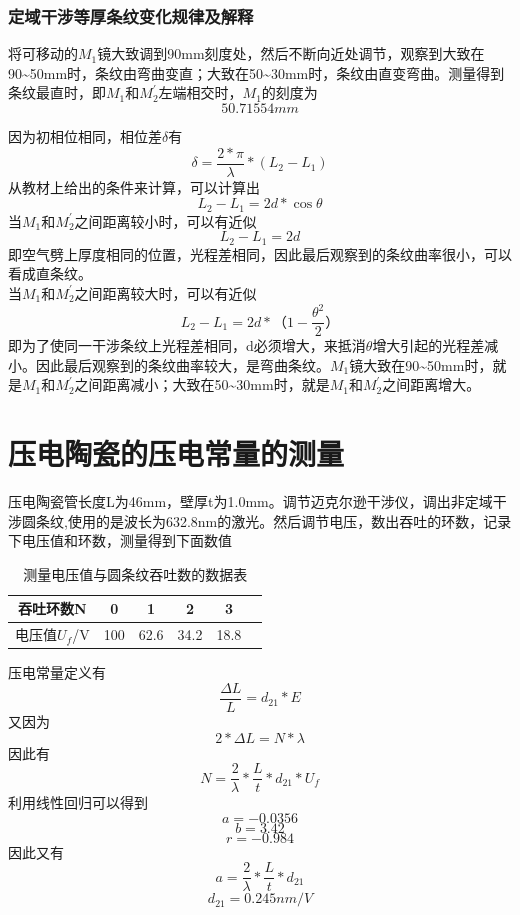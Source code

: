 \documentclass[a4paper,11pt]{article}
\begin{document}
\subsubsection{定域干涉等厚条纹变化规律及解释}
     将可移动的$M_{1}$镜大致调到90mm刻度处，然后不断向近处调节，观察到大致在90\~{}50mm时，条纹由弯曲变直；大致在50\~{}30mm时，条纹由直变弯曲。测量得到条纹最直时，即$M_{1}$和$M_{2}^{\prime}$左端相交时，$M_{1}$的刻度为$$ 50.71554 mm $$
     
     因为初相位相同，相位差$\delta$有$$\delta = \frac{2*\pi}{\lambda}*(L_{2}- L_{1})$$
     从教材上给出的条件来计算，可以计算出$$L_{2}- L_{1} = 2d*\cos\theta$$
     当$M_{1}$和$M_{2}^{\prime}$之间距离较小时，可以有近似$$ L_{2}- L_{1} = 2d $$
     即空气劈上厚度相同的位置，光程差相同，因此最后观察到的条纹曲率很小，可以看成直条纹。\\
     当$M_{1}$和$M_{2}^{\prime}$之间距离较大时，可以有近似$$ L_{2}- L_{1} = 2d*（1-\frac{\theta^2}{2}） $$
     即为了使同一干涉条纹上光程差相同，d必须增大，来抵消$\theta$增大引起的光程差减小。因此最后观察到的条纹曲率较大，是弯曲条纹。$M_{1}$镜大致在90\~{}50mm时，就是$M_{1}$和$M_{2}^{\prime}$之间距离减小；大致在50\~{}30mm时，就是$M_{1}$和$M_{2}^{\prime}$之间距离增大。
     

    
    
    



\section{压电陶瓷的压电常量的测量}
    压电陶瓷管长度L为46mm，壁厚t为1.0mm。调节迈克尔逊干涉仪，调出非定域干涉圆条纹,使用的是波长为632.8nm的激光。然后调节电压，数出吞吐的环数，记录下电压值和环数，测量得到下面数值
	\begin{table}[H]
		\centering\caption{测量电压值与圆条纹吞吐数的数据表}
		\small
		\begin{tabularx}{.85\linewidth}{C{1} *5{C{.8}}}
			\toprule
			\textbf{吞吐环数N} &
			0 &
			1 &
			2 &
			3 & \\
			\midrule
			电压值$ U_{f} $/V     & 100  & 62.6 & 34.2 &  18.8    \\
			\bottomrule
		\end{tabularx}
		\vspace{3ex}
	\end{table}\noindent%
    压电常量定义有
    $$ \dfrac{\Delta L}{L} = d_{21} * E $$
    又因为
    $$ 2 * \Delta L = N * \lambda $$
    因此有
    $$ N = \frac{2}{\lambda} * \frac{L}{t} *d_{21} * U_{f} $$
    利用线性回归可以得到
    $$ a = - 0.0356 $$
	$$ b = 3.42$$
	$$ r = -0.984 $$
	因此又有
	$$ a = \frac{2}{\lambda} * \frac{L}{t} *d_{21} $$
	$$ d_{21} = 0.245 nm/V $$
	
\end{document}
